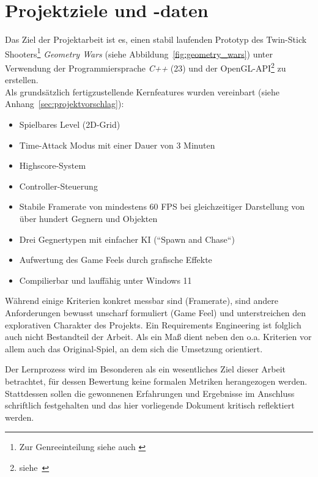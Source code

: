 \section{Projektziele und -daten}\label{sec:projektdaten}

Das Ziel der Projektarbeit ist es, einen stabil laufenden Prototyp des Twin-Stick Shooters\footnote{
Zur Genreeinteilung siehe auch \cite[]{GameDeveloper}
} \textit{Geometry Wars} (siehe Abbildung~\ref{fig:geometry_wars}) unter Verwendung der Programmiersprache \textit{C++} (23) und der OpenGL-API\footnote{siehe~\cite[]{OpenGLHomepage}
}  zu erstellen.\\

\noindent
Als grundsätzlich fertigzustellende Kernfeatures wurden vereinbart (siehe Anhang~\ref{sec:projektvorschlag}):

\vspace{2mm}
\begin{itemize}
    \itemsep0.5em
    \item Spielbares Level (2D-Grid)
    \item Time-Attack Modus mit einer Dauer von 3 Minuten
    \item Highscore-System
    \item Controller-Steuerung
    \item Stabile Framerate von mindestens 60 FPS bei gleichzeitiger Darstellung von über hundert Gegnern und Objekten
    \item Drei Gegnertypen mit einfacher KI (``Spawn and Chase``)
    \item Aufwertung des Game Feels durch grafische Effekte
    \item Compilierbar und lauffähig unter Windows 11
\end{itemize}
\vspace{2mm}

Während einige Kriterien konkret messbar sind (Framerate), sind andere Anforderungen bewusst unscharf formuliert (Game Feel) und unterstreichen den explorativen Charakter des Projekts.
Ein Requirements Engineering ist folglich auch nicht Bestandteil der Arbeit.
Als ein Maß dient neben den o.a. Kriterien vor allem auch das Original-Spiel, an dem sich die Umsetzung orientiert.\par

Der Lernprozess wird im Besonderen als ein wesentliches Ziel dieser Arbeit betrachtet, für dessen Bewertung keine formalen Metriken herangezogen werden.
Stattdessen sollen die gewonnenen Erfahrungen und Ergebnisse im Anschluss schriftlich festgehalten und das hier vorliegende Dokument kritisch reflektiert werden.\par


